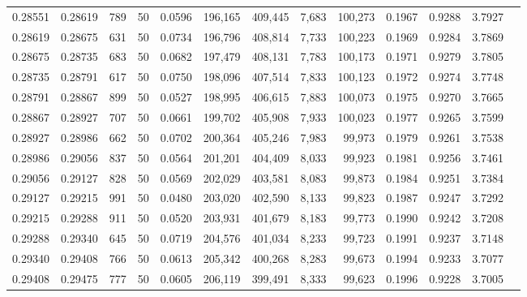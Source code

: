 \begin{tabular}{rrrrrrrrrrrrr}
0.28551 & 0.28619 &   789 &  50 &                                     0.0596 & 196,165 & 409,445 &   7,683 & 100,273 & 0.1967 & 0.9288 & 3.7927 \\
0.28619 & 0.28675 &   631 &  50 &                                     0.0734 & 196,796 & 408,814 &   7,733 & 100,223 & 0.1969 & 0.9284 & 3.7869 \\
0.28675 & 0.28735 &   683 &  50 &                                     0.0682 & 197,479 & 408,131 &   7,783 & 100,173 & 0.1971 & 0.9279 & 3.7805 \\
0.28735 & 0.28791 &   617 &  50 &                                     0.0750 & 198,096 & 407,514 &   7,833 & 100,123 & 0.1972 & 0.9274 & 3.7748 \\
0.28791 & 0.28867 &   899 &  50 &                                     0.0527 & 198,995 & 406,615 &   7,883 & 100,073 & 0.1975 & 0.9270 & 3.7665 \\
0.28867 & 0.28927 &   707 &  50 &                                     0.0661 & 199,702 & 405,908 &   7,933 & 100,023 & 0.1977 & 0.9265 & 3.7599 \\
0.28927 & 0.28986 &   662 &  50 &                                     0.0702 & 200,364 & 405,246 &   7,983 &  99,973 & 0.1979 & 0.9261 & 3.7538 \\
0.28986 & 0.29056 &   837 &  50 &                                     0.0564 & 201,201 & 404,409 &   8,033 &  99,923 & 0.1981 & 0.9256 & 3.7461 \\
0.29056 & 0.29127 &   828 &  50 &                                     0.0569 & 202,029 & 403,581 &   8,083 &  99,873 & 0.1984 & 0.9251 & 3.7384 \\
0.29127 & 0.29215 &   991 &  50 &                                     0.0480 & 203,020 & 402,590 &   8,133 &  99,823 & 0.1987 & 0.9247 & 3.7292 \\
0.29215 & 0.29288 &   911 &  50 &                                     0.0520 & 203,931 & 401,679 &   8,183 &  99,773 & 0.1990 & 0.9242 & 3.7208 \\
0.29288 & 0.29340 &   645 &  50 &                                     0.0719 & 204,576 & 401,034 &   8,233 &  99,723 & 0.1991 & 0.9237 & 3.7148 \\
0.29340 & 0.29408 &   766 &  50 &                                     0.0613 & 205,342 & 400,268 &   8,283 &  99,673 & 0.1994 & 0.9233 & 3.7077 \\
0.29408 & 0.29475 &   777 &  50 &                                     0.0605 & 206,119 & 399,491 &   8,333 &  99,623 & 0.1996 & 0.9228 & 3.7005 \\

\end{tabular}
